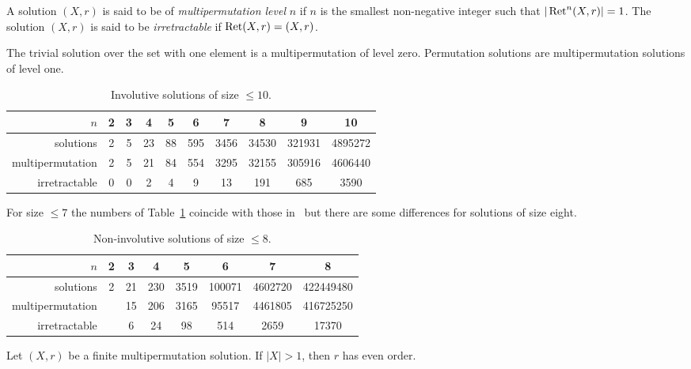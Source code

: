\begin{definition}
    A solution $(X,r)$ is said to be of \emph{multipermutation level} $n$ 
    if $n$ is the smallest non-negative integer 
    such that $|\operatorname{Ret}^n(X,r)|=1$. The solution $(X,r)$ is said to be 
    \emph{irretractable} if $\operatorname{Ret}(X,r)=(X,r)$. 
\end{definition}

The trivial solution over the set with one element is a multipermutation of level zero. 
Permutation solutions are multipermutation solutions of level one. 

\begin{example}

\end{example}

\begin{example}

\end{example}

\begin{table}[H]
\centering
\caption{Involutive solutions of size $\leq10$.}
\begin{tabular}{|r|ccccccccc|}
\hline
$n$ & 2 & 3 & 4 & 5 & 6 & 7 & 8 & 9 & 10\tabularnewline
\hline 
solutions & 2 & 5 & 23 & 88 & 595 & 3456 & 34530 & 321931 & 4895272\tabularnewline
multipermutation & 2 & 5 & 21 & 84 & 554 & 3295 & 32155 & 305916 & 4606440\tabularnewline
irretractable & 0 & 0 & 2 & 4 & 9 & 13 & 191 & 685 & 3590\tabularnewline
\hline
\end{tabular}
\label{tab:INV_mp}
\end{table}

For size $\leq7$ the numbers of Table~\ref{tab:INV_mp} coincide with those in~\cite{MR1722951}
but there are some differences for solutions of size eight. 

\begin{table}[H]
\centering
\caption{Non-involutive solutions of size $\leq8$.}
\begin{tabular}{|r|ccccccc|}
\hline
$n$ & 2 & 3 & 4 & 5 & 6 & 7 & 8 \tabularnewline
\hline 
solutions & 2 & 21 & 230 & 3519 & 100071 & 4602720  & 422449480 \tabularnewline
multipermutation &  & 15 & 206 & 3165 & 95517 & 4461805 & 416725250 \tabularnewline
irretractable & & 6 & 24 & 98 & 514 & 2659 & 17370\tabularnewline
\hline
\end{tabular}
\label{tab:mp}
\end{table}


\begin{theorem}
\label{thm:CJKAV}
    Let $(X,r)$ be a finite multipermutation solution. If $|X|>1$, then $r$ has even order. 
\end{theorem}

